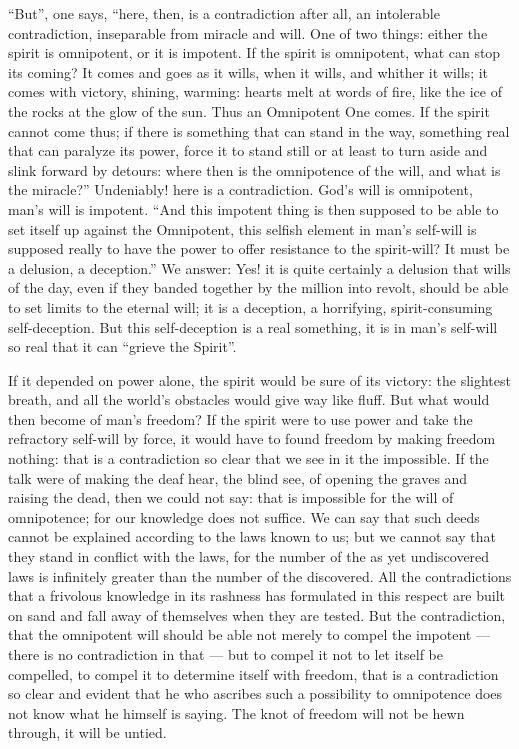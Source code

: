 \documentclass[12pt,a4paper,openany]{book}
\newcommand{\opage}[1]{\marginnote{\footnotesize\textit{[#1]}}}
\begin{document}
``But'', one says, ``here, then, is a contradiction after all,
an intolerable contradiction, inseparable from miracle and will.
One of two things: either the spirit is omnipotent, or it is impotent.
If the spirit is omnipotent, what can stop its
coming? It comes and goes as it wills, when it
wills, and whither it wills; it comes with victory, shining,
warming: hearts melt at words of fire, like the ice
of the rocks at the glow of the sun. Thus an Omnipotent One comes. If
the spirit cannot come thus; if there is something that can
stand in the way, something real that can paralyze
its power, force it to stand still or at least to turn
aside and slink forward by detours: where then is the omnipotence of the will,
and what is the miracle?'' Undeniably! here is a contradiction.
God's will is omnipotent, man's will is impotent.
``And this impotent thing is then supposed to be able
to set itself up against the Omnipotent, this selfish element
in man's self-will is supposed really to have the power to
offer resistance to the spirit-will? It must be a delusion,
a deception.'' We answer: Yes! it is quite certainly a
delusion that wills of the day, even if they banded together
by the million into revolt, should be able to set limits to the eternal
will; it is a deception, a horrifying,
\setcounter{footnote}{0}%
\opage{56}spirit-consuming self-deception. But this self-deception is a
real something, it is in man's self-will so real
that it can ``grieve the Spirit''.

If it depended on power alone, the spirit would be sure
of its victory: the slightest breath, and all the world's obstacles
would give way like fluff. But what would then become of man's
freedom? If the spirit were to use power and take
the refractory self-will by force, it would have to found
freedom by making freedom nothing: that is a
contradiction so clear that we see in it the impossible. If
the talk were of making the deaf hear, the blind see,
of opening the graves and raising the dead, then we could not
say: that is impossible for the will of omnipotence; for our knowledge does
not suffice. We can say that such deeds cannot be
explained according to the laws known to us; but we cannot
say that they stand in conflict with the laws, for the number of the as yet undiscovered
laws is infinitely greater than the number of the
discovered. All the contradictions that a frivolous knowledge in
its rashness has formulated in this respect are built
on sand and fall away of themselves when they are tested. But
the contradiction, that the omnipotent will should be able not merely
to compel the impotent --- there is no contradiction in that
--- but to compel it not to let itself be compelled, to compel it to
determine itself with freedom, that is a contradiction so clear
and evident that he who ascribes such a possibility to omnipotence
does not know what he himself is saying. The knot of freedom
will not be hewn through, it will be untied.
\end{document}
